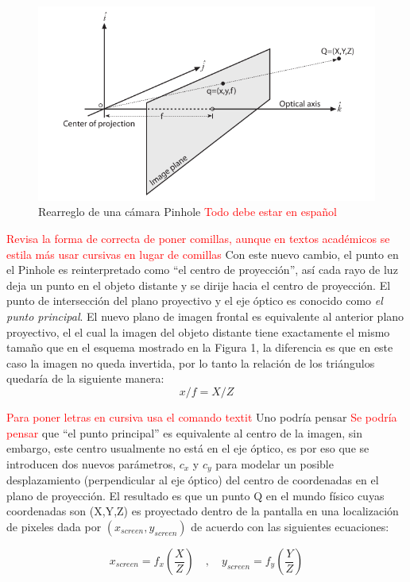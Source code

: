 \documentclass{book}
\begin{document}
\begin{figure}
	\centering
	\includegraphics[scale=0.5]{rearreglo_pinhole.png}
    \caption{Rearreglo de una cámara Pinhole \textcolor{red}{Todo debe estar en español}}
\end{figure} 
\textcolor{red}{Revisa la forma de correcta de poner comillas, aunque en textos académicos se estila más usar cursivas en lugar de comillas}
Con este nuevo cambio, el punto en el Pinhole es reinterpretado como ``el centro de proyección'', así cada rayo de luz deja un punto en el objeto distante y se dirije hacia el centro de proyección. El punto de intersección del plano proyectivo y el eje óptico es conocido como \textit{el punto principal}. El nuevo plano de imagen frontal es equivalente al anterior plano proyectivo, el el cual la imagen del objeto distante tiene exactamente el mismo tamaño que en el esquema mostrado en la Figura 1, la diferencia es que en este caso la imagen no queda invertida, por lo tanto la relación de los triángulos quedaría de la siguiente manera: 
\[x/f = X/Z\]

\textcolor{red}{Para poner letras en cursiva usa el comando textit}
Uno podría pensar \textcolor{red}{Se podría pensar} que ``el punto principal'' es equivalente al centro de la imagen, sin embargo, este centro usualmente no está en el eje óptico, es por eso que se introducen dos nuevos parámetros, $c_{x}$ y $c_{y}$ para modelar un posible desplazamiento (perpendicular al eje óptico) del centro de coordenadas en el plano de proyección. El resultado es que un punto Q en el mundo físico cuyas coordenadas son  (X,Y,Z) es proyectado dentro de la pantalla en una localización de pixeles dada por $(x_{screen},y_{screen})$ de acuerdo con las siguientes ecuaciones:

\[x_{screen}=f_{x}(\frac{X}{Z}) \quad,\quad y_{screen}=f_{y}(\frac{Y}{Z})\]	\\
\end{document}
